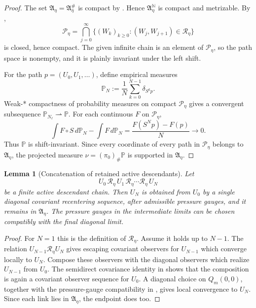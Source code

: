 \documentclass[11pt]{amsart}
\numberwithin{equation}{section}
\theoremstyle{plain}
\newtheorem{lemma}[theorem]{Lemma}
\theoremstyle{definition}
\theoremstyle{remark}
\begin{document}
\begin{proof}
The set \(\mathfrak A_\eta=\mathfrak A_\eta^\#\) is compact by
.  Hence
\(\mathfrak A_\eta^{\mathbb N}\) is compact and metrizable.  By
,
\[
   \mathscr P_\eta
   =
   \bigcap_{j=0}^\infty
   \{(W_k)_{k\ge0}:(W_j,W_{j+1})\in\mathcal R_\eta\}
\]
is closed, hence compact.  The given infinite chain is an element of
\(\mathscr P_\eta\), so the path space is nonempty, and it is plainly invariant
under the left shift.

For the path \(p=(U_0,U_1,\ldots)\), define empirical measures
\[
   \mathbb P_N:=\frac1N\sum_{k=0}^{N-1}\delta_{S^kp}.
\]
Weak-* compactness of probability measures on compact \(\mathscr P_\eta\) gives
a convergent subsequence \(\mathbb P_{N_\ell}\rightharpoonup\mathbb P\).  For
each continuous \(F\) on \(\mathscr P_\eta\),
\[
   \int F\circ S\,d\mathbb P_N-\int F\,d\mathbb P_N
   =
   \frac{F(S^Np)-F(p)}{N}\to0.
\]
Thus \(\mathbb P\) is shift-invariant.  Since every coordinate of every path in
\(\mathscr P_\eta\) belongs to \(\mathfrak A_\eta\), the projected measure
\(\nu=(\pi_0)_\#\mathbb P\) is supported in \(\mathfrak A_\eta\).
\end{proof}

\begin{lemma}[Concatenation of retained active descendants]
\label{lem:active-descendant-concatenation}
Let
\[
   U_0\,\mathcal R_\eta\,U_1\,\mathcal R_\eta\cdots
   \mathcal R_\eta\,U_N
\]
be a finite active descendant chain.  Then \(U_N\) is obtained from \(U_0\) by a
single diagonal covariant recentering sequence, after admissible pressure
gauges, and it remains in \(\mathfrak A_\eta\).  The pressure gauges in the
intermediate limits can be chosen compatibly with the final diagonal limit.
\end{lemma}

\begin{proof}
For \(N=1\) this is the definition of \(\mathcal R_\eta\).  Assume it holds up
to \(N-1\).  The relation \(U_{N-1}\mathcal R_\eta U_N\) gives escaping
covariant observers for \(U_{N-1}\) which converge locally to \(U_N\).  Compose
these observers with the diagonal observers which realize \(U_{N-1}\) from
\(U_0\).  The semidirect covariance identity in
 shows that the composition is again a
covariant observer sequence for \(U_0\).  A diagonal choice on \(Q_m(0,0)\),
together with the pressure-gauge compatibility in
, gives local convergence to \(U_N\).  Since each
link lies in \(\mathfrak A_\eta\), the endpoint does too.
\end{proof}
\end{document}
